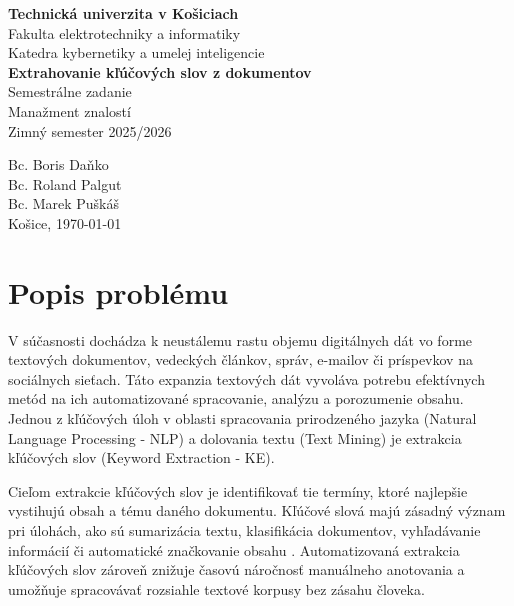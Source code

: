 \documentclass[a4paper,12pt]{article}
\begin{document}
\begin{titlepage}
    \centering
    {\Large \textbf{Technická univerzita v Košiciach}}\\[0.3em]
    {\large Fakulta elektrotechniky a informatiky}\\[0.3em]
    {\large Katedra kybernetiky a umelej inteligencie}\\[2cm]
    
    \vspace*{\fill}
    {\huge \textbf{Extrahovanie kľúčových slov z dokumentov}}\\[1cm]
    {\Large Semestrálne zadanie}\\[0.3em]
    {\large Manažment znalostí}\\
    {\large Zimný semester 2025/2026}\\
    \vspace*{\fill}
    
    \begin{flushright}
        {\large Bc. Boris Daňko}\\
        {\large Bc. Roland Palgut}\\
        {\large Bc. Marek Puškáš}\\[1cm]
        {\large Košice, \today}
    \end{flushright}
\end{titlepage}


\tableofcontents
\newpage
\setcounter{tocdepth}{2}


\section{Popis problému}

V súčasnosti dochádza k neustálemu rastu objemu digitálnych dát vo forme textových dokumentov, vedeckých článkov, správ, e-mailov či príspevkov na sociálnych sieťach. Táto expanzia textových dát vyvoláva potrebu efektívnych metód na ich automatizované spracovanie, analýzu a porozumenie obsahu. Jednou z kľúčových úloh v oblasti spracovania prirodzeného jazyka (Natural Language Processing - NLP) a dolovania textu (Text Mining) je extrakcia kľúčových slov (Keyword Extraction - KE). 

Cieľom extrakcie kľúčových slov je identifikovať tie termíny, ktoré najlepšie vystihujú obsah a tému daného dokumentu. Kľúčové slová majú zásadný význam pri úlohách, ako sú sumarizácia textu, klasifikácia dokumentov, vyhľadávanie informácií či automatické značkovanie obsahu \cite{rose2010automatic}. Automatizovaná extrakcia kľúčových slov zároveň znižuje časovú náročnosť manuálneho anotovania a umožňuje spracovávať rozsiahle textové korpusy bez zásahu človeka.
\end{document}
